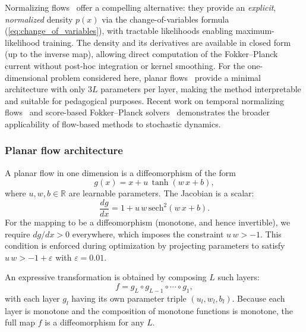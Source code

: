 Normalizing flows~\cite{Rezende2015,Kobyzev2021,Papamakarios2021} offer a compelling alternative: they provide an \emph{explicit}, \emph{normalized} density $p(x)$ via the change-of-variables formula (\cref{eq:change_of_variables}), with tractable likelihoods enabling maximum-likelihood training.
The density and its derivatives are available in closed form (up to the inverse map), allowing direct computation of the Fokker--Planck current without post-hoc integration or kernel smoothing.
For the one-dimensional problem considered here, planar flows~\cite{Rezende2015} provide a minimal architecture with only $3L$ parameters per layer, making the method interpretable and suitable for pedagogical purposes.
Recent work on temporal normalizing flows~\cite{Feng2022} and score-based Fokker--Planck solvers~\cite{Hu2024,Nagel2025} demonstrates the broader applicability of flow-based methods to stochastic dynamics.

\subsubsection{Planar flow architecture}
\label{sec:planar_flow}

A planar flow in one dimension is a diffeomorphism of the form~\cite{Kobyzev2021}
\begin{equation}
    g(x) = x + u\,\tanh(w\,x + b),
    \label{eq:planar_layer}
\end{equation}
where $u, w, b \in \mathbb{R}$ are learnable parameters.
The Jacobian is a scalar:
\begin{equation}
    \frac{dg}{dx} = 1 + u\,w\,\mathrm{sech}^2(w\,x + b).
    \label{eq:planar_jacobian}
\end{equation}
For the mapping to be a diffeomorphism (monotone, and hence invertible), we require $dg/dx > 0$ everywhere, which imposes the constraint $u\,w > -1$.
This condition is enforced during optimization by projecting parameters to satisfy $u\,w > -1 + \varepsilon$ with $\varepsilon = 0.01$.

An expressive transformation is obtained by composing $L$ such layers:
\begin{equation}
    f = g_L \circ g_{L-1} \circ \cdots \circ g_1,
    \label{eq:composition}
\end{equation}
with each layer $g_l$ having its own parameter triple $(u_l, w_l, b_l)$.
Because each layer is monotone and the composition of monotone functions is monotone, the full map $f$ is a diffeomorphism for any $L$.

